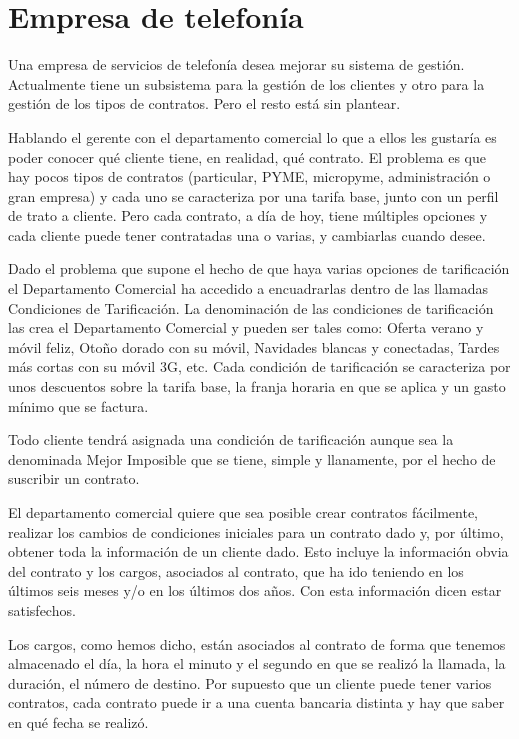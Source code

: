 \documentclass[a4paper]{article}
\begin{document}
\section{Empresa de telefonía}
Una empresa de servicios de telefonía desea mejorar su sistema de gestión. Actualmente tiene un subsistema para la gestión de los clientes y otro para la gestión de los tipos de contratos. Pero el resto está sin plantear. 

Hablando el gerente con el departamento comercial lo que a ellos les gustaría es poder conocer qué cliente tiene, en realidad, qué contrato. El problema es que hay pocos tipos de contratos (particular, PYME, micropyme, administración o gran empresa) y cada uno se caracteriza por una tarifa base, junto con un perfil de trato a cliente. Pero cada contrato, a día de hoy, tiene múltiples opciones y cada cliente puede tener contratadas una o varias, y cambiarlas cuando desee. 

Dado el problema que supone el hecho de que haya varias opciones de tarificación el Departamento Comercial ha accedido a encuadrarlas dentro de las llamadas Condiciones de Tarificación. La denominación de las condiciones de tarificación las crea el Departamento Comercial y pueden ser tales como: Oferta verano y móvil feliz, Otoño dorado con su móvil, Navidades blancas y conectadas, Tardes más cortas con su móvil 3G, etc. Cada condición de tarificación se caracteriza por unos descuentos sobre la tarifa base, la franja horaria en que se aplica y un gasto mínimo que se factura. 

Todo cliente tendrá asignada una condición de tarificación aunque sea la denominada Mejor Imposible que se tiene, simple y llanamente, por el hecho de suscribir un contrato.

El departamento comercial quiere que sea posible crear contratos fácilmente, realizar los cambios de condiciones iniciales para un contrato dado y, por último, obtener toda la información de un cliente dado. Esto incluye la información obvia del contrato y los cargos, asociados al contrato, que ha ido teniendo en los últimos seis meses y/o en los últimos dos años. Con esta información dicen estar satisfechos. 

Los cargos, como hemos dicho, están asociados al contrato de forma que tenemos almacenado el día, la hora el minuto y el segundo en que se realizó la llamada, la duración, el número de destino. Por supuesto que un cliente puede tener varios contratos, cada contrato puede ir a una cuenta bancaria distinta y hay que
saber en qué fecha se realizó.
\end{document}
